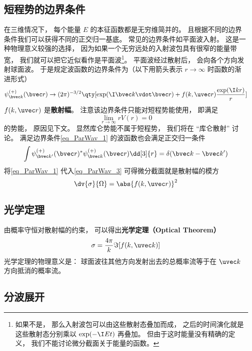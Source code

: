 \subsection{短程势的边界条件}
在三维情况下， 每个能量 $E$ 的本征函数都是无穷维简并的。 且根据不同的边界条件我们可以获得不同的正交归一基底。 常见的边界条件如平面波入射。 这是一种物理意义较强的选择， 因为如果一个无穷远处的入射波包具有很窄的能量带宽， 我们就可以把它近似看作是平面波\footnote{如果不是， 那么入射波包可以由这些散射态叠加而成， 之后的时间演化就是这些散射态分别乘以 $\exp(-\I E t)$ 再叠加。 但由于这时能量没有精确的定义， 我们不能讨论微分截面关于能量的函数。}。 平面波经过散射后， 会向各个方向发射球面波。 于是规定波函数的边界条件为（以下用箭头表示 $r\to\infty$ 时函数的渐进形式）
\begin{equation}\label{eq_ParWav_1}
\psi_{\bvec k}^{(+)}(\bvec r) \rightarrow (2\pi)^{-3/2} \qty[\exp(\I \bvec k \vdot \bvec r) + f(k, \uvec r) \frac{\exp(\I k r)}{r}]
\end{equation}
$f(k, \uvec r)$ 是\textbf{散射幅}。 注意该边界条件只能对短程势能使用， 即满足
\begin{equation}
\lim_{r\to\infty} r V(r) = 0
\end{equation}
的势能， 原因见下文。 显然库仑势能不属于短程势， 我们将在 “库仑散射” 讨论。 满足边界条件\autoref{eq_ParWav_1} 的波函数也会满足正交归一条件
\begin{equation}
\int \psi_{\bvec k'}^{(+)}(\bvec r)^* \psi_{\bvec k}^{(+)}(\bvec r) \dd[3]{r} = \delta(\bvec k - \bvec k')
\end{equation}
将\autoref{eq_ParWav_1} 代入\autoref{eq_ParWav_3} 可得微分截面就是散射幅的模方
\begin{equation}
\dv{\sigma}{\Omega} = \abs{f(k, \uvec r)}^2
\end{equation}

\subsection{光学定理}
由概率守恒对散射幅的约束， 可以得出\textbf{光学定理（Optical Theorem）}
\begin{equation}
\sigma = \frac{4\pi}{k} \Im[f(k, \uvec k)]
\end{equation}
光学定理的物理意义是： 球面波往其他方向发射出去的总概率流等于在 $\uvec k$ 方向抵消的概率流。

\subsection{分波展开}

